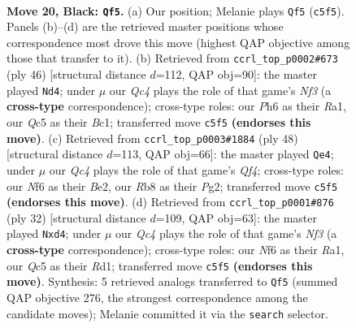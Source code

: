 \documentclass[11pt]{article}
\begin{document}
\clearpage

\begin{figure}[p]\centering
\begin{subfigure}{0.46\textwidth}\centering
\resizebox{\linewidth}{!}{%
\newchessgame
\chessboard[
  setfen={1rb1r1k1/p1p2pp1/2n2n1p/p1q4P/2P2P2/2P1P3/8/R1BQKBNR b Q - 3 20},
  showmover=false,
  pgfstyle=straightmove, color=movearrow, markmove={c5-f5}
]}
\caption{}
\end{subfigure}\hfill
\begin{subfigure}{0.46\textwidth}\centering
\resizebox{\linewidth}{!}{%
\newchessgame
\chessboard[
  setfen={r1bqk2r/1p2bp2/4p2p/3pP1p1/6Q1/Pp3N1P/1P3PP1/R1B1R1K1 w kq - 2 24},
  showmover=false,
  pgfstyle=straightmove, color=movearrow, markmove={f3-d4}
]}
\caption{}
\end{subfigure}
\\[4pt]
\begin{subfigure}{0.46\textwidth}\centering
\resizebox{\linewidth}{!}{%
\newchessgame
\chessboard[
  setfen={1kbr3r/q4p2/p1np1p1b/1p3P1p/5Q1P/P1N2NR1/1PP1B1P1/1K1R4 w - - 3 25},
  showmover=false,
  pgfstyle=straightmove, color=movearrow, markmove={f4-e4}
]}
\caption{}
\end{subfigure}\hfill
\begin{subfigure}{0.46\textwidth}\centering
\resizebox{\linewidth}{!}{%
\newchessgame
\chessboard[
  setfen={r1b1r1k1/1p1nqpp1/2p4p/p7/P2p4/1Q2PN2/1P2BPPP/R2R2K1 w - - 0 17},
  showmover=false,
  pgfstyle=straightmove, color=movearrow, markmove={f3-d4}
]}
\caption{}
\end{subfigure}
\caption{\textbf{Move 20, Black: \texttt{Qf5}.} (a) Our position; Melanie plays \texttt{Qf5} (\texttt{c5f5}). Panels (b)--(d) are the retrieved master positions whose correspondence most drove this move (highest QAP objective among those that transfer to it). (b) Retrieved from \texttt{ccrl\_top\_p0002\#673} (ply 46) [structural distance $d$=112, QAP obj=90]: the master played \texttt{Nd4}; under $\mu$ our \emph{Qc4} plays the role of that game's \emph{Nf3} (a \textbf{cross-type} correspondence); cross-type roles: our \emph{P}h6 as their \emph{R}a1, our \emph{Q}c5 as their \emph{B}c1; transferred move \texttt{c5f5} \textbf{(endorses this move)}. (c) Retrieved from \texttt{ccrl\_top\_p0003\#1884} (ply 48) [structural distance $d$=113, QAP obj=66]: the master played \texttt{Qe4}; under $\mu$ our \emph{Qc4} plays the role of that game's \emph{Qf4}; cross-type roles: our \emph{N}f6 as their \emph{B}e2, our \emph{R}b8 as their \emph{P}g2; transferred move \texttt{c5f5} \textbf{(endorses this move)}. (d) Retrieved from \texttt{ccrl\_top\_p0001\#876} (ply 32) [structural distance $d$=109, QAP obj=63]: the master played \texttt{Nxd4}; under $\mu$ our \emph{Qc4} plays the role of that game's \emph{Nf3} (a \textbf{cross-type} correspondence); cross-type roles: our \emph{N}f6 as their \emph{R}a1, our \emph{Q}c5 as their \emph{R}d1; transferred move \texttt{c5f5} \textbf{(endorses this move)}. Synthesis: 5 retrieved analogs transferred to \texttt{Qf5} (summed QAP objective 276, the strongest correspondence among the candidate moves); Melanie committed it via the \texttt{search} selector.}
\label{fig:thought-m39}
\end{figure}
\end{document}
